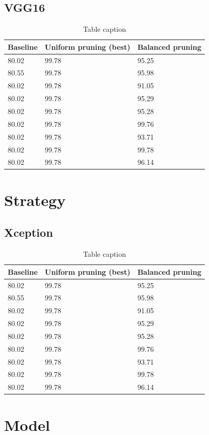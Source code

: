 \documentclass[final,5p,times,twocolumn,authoryear]{elsarticle}
\begin{document}
\subsection{VGG16}
\begin{table}[htbp]
\centering
\caption{Table caption}
\begin{tabular}{lll}
\hline
Baseline & Uniform pruning (best) & Balanced pruning \\
\hline
80.02 & 99.78 & 95.25 \\
80.55 & 99.78 & 95.98 \\
80.02 & 99.78 & 91.05 \\
80.02 & 99.78 & 95.29 \\
80.02 & 99.78 & 95.28 \\
80.02 & 99.78 & 99.76 \\
80.02 & 99.78 & 93.71 \\
80.02 & 99.78 & 99.78 \\
80.02 & 99.78 & 96.14 \\
\hline
\end{tabular}
\end{table}
\section{Strategy}
\subsection{Xception}
\begin{table}[htbp]
\centering
\caption{Table caption}
\begin{tabular}{lll}
\hline
Baseline & Uniform pruning (best) & Balanced pruning \\
\hline
80.02 & 99.78 & 95.25 \\
80.55 & 99.78 & 95.98 \\
80.02 & 99.78 & 91.05 \\
80.02 & 99.78 & 95.29 \\
80.02 & 99.78 & 95.28 \\
80.02 & 99.78 & 99.76 \\
80.02 & 99.78 & 93.71 \\
80.02 & 99.78 & 99.78 \\
80.02 & 99.78 & 96.14 \\
\hline
\end{tabular}
\end{table}
\section{Model}
\end{document}
